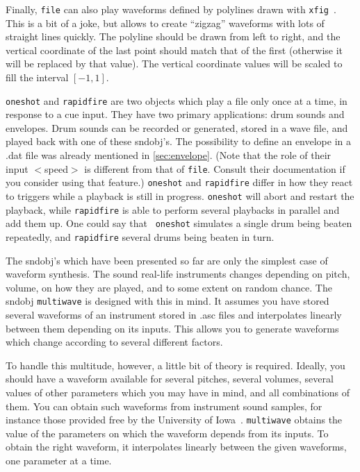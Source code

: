 \documentclass{article}
\begin{document}
Finally, {\tt file} can also play waveforms defined by polylines drawn with
{\tt xfig}~\cite{xfig}.  This is a bit of a joke, but allows to create
``zigzag'' waveforms with lots of straight lines quickly.  The polyline
should be drawn from left to right, and the vertical coordinate of the last
point should match that of the first (otherwise it will be replaced by that
value).  The vertical coordinate values will be scaled to fill the interval
$[-1,1]$.

{\tt oneshot} and {\tt rapidfire} are two objects which play a file only once
at a time, in response to a cue input.  They have two primary applications:
drum sounds and envelopes.  Drum sounds can be recorded or generated, stored in
a wave file, and played back with one of these sndobj's.  The possibility to
define an envelope in a .dat file was already mentioned in
\autoref{sec:envelope}.  (Note that the role of their input $<$speed$>$ is
different from that of {\tt file}.  Consult their documentation if you consider
using that feature.)  {\tt oneshot} and {\tt rapidfire} differ in how they
react to triggers while a playback is still in progress.  {\tt oneshot} will
abort and restart the playback, while {\tt rapidfire} is able to perform
several playbacks in parallel and add them up.  One could say that {\tt
oneshot} simulates a single drum being beaten repeatedly, and {\tt rapidfire}
several drums being beaten in turn.

The sndobj's which have been presented so far are only the simplest case of
waveform synthesis.  The sound real-life instruments changes depending on
pitch, volume, on how they are played, and to some extent on random chance.
The sndobj {\tt multiwave} is designed with this in mind.  It assumes you have
stored several waveforms of an instrument stored in .asc files and interpolates
linearly between them depending on its inputs.  This allows you to generate
waveforms which change according to several different factors.

To handle this multitude, however, a little bit of theory is required.
Ideally, you should have a waveform available for several pitches, several
volumes, several values of other parameters which you may have in mind, and all
combinations of them.  You can obtain such waveforms from instrument sound
samples, for instance those provided free by the University of Iowa~\cite{iow}.
{\tt multiwave} obtains the value of the parameters on which the waveform
depends from its inputs.  To obtain the right waveform, it interpolates
linearly between the given waveforms, one parameter at a time.
\end{document}
